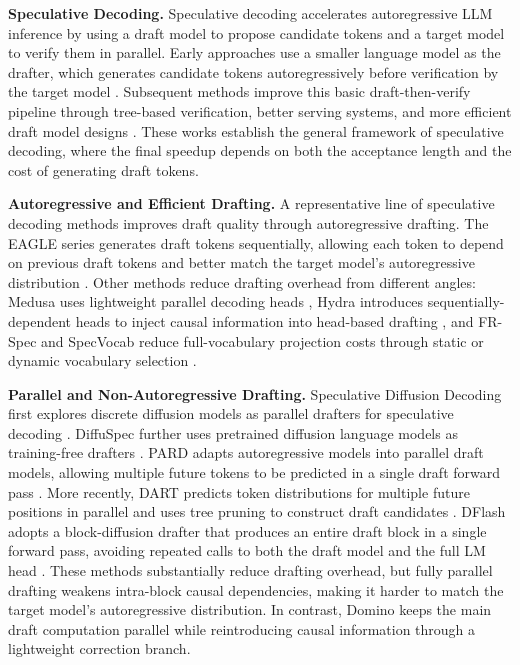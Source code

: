 \noindent\textbf{Speculative Decoding.}
Speculative decoding accelerates autoregressive LLM inference by using a draft model to propose candidate tokens and a target model to verify them in parallel. Early approaches use a smaller language model as the drafter, which generates candidate tokens autoregressively before verification by the target model \citep{leviathan2023fast, chen2023accelerating}. Subsequent methods improve this basic draft-then-verify pipeline through tree-based verification, better serving systems, and more efficient draft model designs \citep{miao2023specinfer, cai2024medusa, li2024eagle}. These works establish the general framework of speculative decoding, where the final speedup depends on both the acceptance length and the cost of generating draft tokens.

\noindent\textbf{Autoregressive and Efficient Drafting.}
A representative line of speculative decoding methods improves draft quality through autoregressive drafting. The EAGLE series generates draft tokens sequentially, allowing each token to depend on previous draft tokens and better match the target model's autoregressive distribution \citep{li2024eagle, li2024eagle2, li2025eagle3}. Other methods reduce drafting overhead from different angles: Medusa uses lightweight parallel decoding heads \citep{cai2024medusa}, Hydra introduces sequentially-dependent heads to inject causal information into head-based drafting \citep{ankner2024hydra}, and FR-Spec and SpecVocab reduce full-vocabulary projection costs through static or dynamic vocabulary selection \citep{zhao2025fr,williams2026speculative}. 

\noindent\textbf{Parallel and Non-Autoregressive Drafting.}
Speculative Diffusion Decoding first explores discrete diffusion models as parallel drafters for speculative decoding \citep{christopher2025speculative}. DiffuSpec further uses pretrained diffusion language models as training-free drafters \citep{li2025diffuspec}. PARD adapts autoregressive models into parallel draft models, allowing multiple future tokens to be predicted in a single draft forward pass \citep{an2026pard}.  More recently, DART predicts token distributions for multiple future positions in parallel and uses  tree pruning to construct draft candidates \citep{liu2026dart}. DFlash adopts a block-diffusion drafter that produces an entire draft block in a single forward pass, avoiding repeated calls to both the draft model and the full LM head \citep{chen2026dflash}. These methods substantially reduce drafting overhead, but fully parallel drafting weakens intra-block causal dependencies, making it harder to match the target model's autoregressive distribution. In contrast, Domino keeps the main draft computation parallel while reintroducing causal information through a lightweight correction branch.